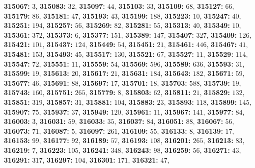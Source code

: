 \textsf{\bfseries 315067:} $3$, \textsf{\bfseries 315083:} $32$, \textsf{\bfseries 315097:} $44$, \textsf{\bfseries 315103:} $33$, \textsf{\bfseries 315109:} $68$, \textsf{\bfseries 315127:} $66$, \textsf{\bfseries 315179:} $86$, \textsf{\bfseries 315181:} $47$, \textsf{\bfseries 315193:} $43$, \textsf{\bfseries 315199:} $188$, \textsf{\bfseries 315223:} $10$, \textsf{\bfseries 315247:} $40$, \textsf{\bfseries 315251:} $194$, \textsf{\bfseries 315257:} $56$, \textsf{\bfseries 315269:} $82$, \textsf{\bfseries 315281:} $55$, \textsf{\bfseries 315313:} $40$, \textsf{\bfseries 315349:} $10$, \textsf{\bfseries 315361:} $372$, \textsf{\bfseries 315373:} $6$, \textsf{\bfseries 315377:} $151$, \textsf{\bfseries 315389:} $147$, \textsf{\bfseries 315407:} $327$, \textsf{\bfseries 315409:} $126$, \textsf{\bfseries 315421:} $101$, \textsf{\bfseries 315437:} $124$, \textsf{\bfseries 315449:} $54$, \textsf{\bfseries 315451:} $21$, \textsf{\bfseries 315461:} $446$, \textsf{\bfseries 315467:} $41$, \textsf{\bfseries 315481:} $153$, \textsf{\bfseries 315493:} $45$, \textsf{\bfseries 315517:} $130$, \textsf{\bfseries 315521:} $67$, \textsf{\bfseries 315527:} $11$, \textsf{\bfseries 315529:} $114$, \textsf{\bfseries 315547:} $72$, \textsf{\bfseries 315551:} $11$, \textsf{\bfseries 315559:} $54$, \textsf{\bfseries 315569:} $596$, \textsf{\bfseries 315589:} $636$, \textsf{\bfseries 315593:} $31$, \textsf{\bfseries 315599:} $19$, \textsf{\bfseries 315613:} $20$, \textsf{\bfseries 315617:} $21$, \textsf{\bfseries 315631:} $184$, \textsf{\bfseries 315643:} $182$, \textsf{\bfseries 315671:} $59$, \textsf{\bfseries 315677:} $46$, \textsf{\bfseries 315691:} $88$, \textsf{\bfseries 315697:} $17$, \textsf{\bfseries 315701:} $18$, \textsf{\bfseries 315703:} $588$, \textsf{\bfseries 315739:} $19$, \textsf{\bfseries 315743:} $160$, \textsf{\bfseries 315751:} $265$, \textsf{\bfseries 315779:} $8$, \textsf{\bfseries 315803:} $62$, \textsf{\bfseries 315811:} $21$, \textsf{\bfseries 315829:} $132$, \textsf{\bfseries 315851:} $319$, \textsf{\bfseries 315857:} $31$, \textsf{\bfseries 315881:} $104$, \textsf{\bfseries 315883:} $23$, \textsf{\bfseries 315893:} $118$, \textsf{\bfseries 315899:} $145$, \textsf{\bfseries 315907:} $75$, \textsf{\bfseries 315937:} $37$, \textsf{\bfseries 315949:} $120$, \textsf{\bfseries 315961:} $11$, \textsf{\bfseries 315967:} $141$, \textsf{\bfseries 315977:} $84$, \textsf{\bfseries 316003:} $3$, \textsf{\bfseries 316031:} $59$, \textsf{\bfseries 316033:} $35$, \textsf{\bfseries 316037:} $84$, \textsf{\bfseries 316051:} $88$, \textsf{\bfseries 316067:} $56$, \textsf{\bfseries 316073:} $71$, \textsf{\bfseries 316087:} $5$, \textsf{\bfseries 316097:} $261$, \textsf{\bfseries 316109:} $55$, \textsf{\bfseries 316133:} $8$, \textsf{\bfseries 316139:} $17$, \textsf{\bfseries 316153:} $99$, \textsf{\bfseries 316177:} $92$, \textsf{\bfseries 316189:} $57$, \textsf{\bfseries 316193:} $108$, \textsf{\bfseries 316201:} $265$, \textsf{\bfseries 316213:} $83$, \textsf{\bfseries 316219:} $7$, \textsf{\bfseries 316223:} $105$, \textsf{\bfseries 316241:} $348$, \textsf{\bfseries 316243:} $98$, \textsf{\bfseries 316259:} $56$, \textsf{\bfseries 316271:} $43$, \textsf{\bfseries 316291:} $317$, \textsf{\bfseries 316297:} $104$, \textsf{\bfseries 316301:} $171$, \textsf{\bfseries 316321:} $47$, 
